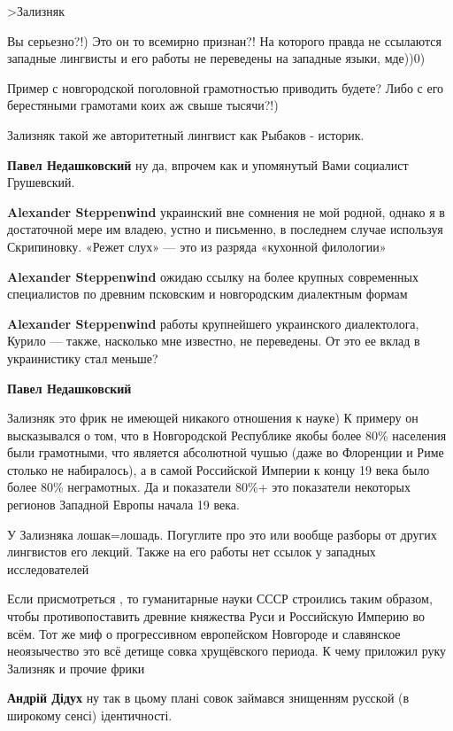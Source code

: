 \begin{itemize}
\begin{itemize}
>Зализняк

Вы серьезно?!) Это он то всемирно признан?! На которого правда не ссылаются
западные лингвисты и его работы не переведены на западные языки, мде))0)

Пример с новгородской поголовной грамотностью приводить будете? Либо с его
берестяными грамотами коих аж свыше тысячи?!)

Зализняк такой же авторитетный лингвист как Рыбаков - историк.

\textbf{Павел Недашковский} ну да, впрочем как и упомянутый Вами социалист Грушевский.

\textbf{Alexander Steppenwind} украинский вне сомнения не мой родной, однако я в достаточной мере им владею, устно и письменно, в последнем случае используя Скрипиновку. «Режет слух» — это из разряда «кухонной филологии»

\textbf{Alexander Steppenwind} ожидаю ссылку на более крупных современных специалистов по древним псковским и новгородским диалектным формам

\textbf{Alexander Steppenwind} работы крупнейшего украинского диалектолога, Курило — также, насколько мне известно, не переведены. От это ее вклад в украинистику стал меньше?

\textbf{Павел Недашковский} 

Зализняк это фрик не имеющей никакого отношения к науке) К примеру он
высказывался о том, что в Новгородской Республике якобы более 80\% населения
были грамотными, что является абсолютной чушью (даже во Флоренции и Риме
столько не набиралось), а в самой Российской Империи к концу 19 века было более
80\% неграмотных. Да и показатели 80\%+ это показатели некоторых регионов
Западной Европы начала 19 века.

У Зализняка лошак=лошадь. Погуглите про это или вообще разборы от других
лингвистов его лекций. Также на его работы нет ссылок у западных исследователей


Если присмотреться , то гуманитарные науки СССР строились таким образом, чтобы
противопоставить древние княжества Руси и Российскую Империю во всём. Тот же
миф о прогрессивном европейском Новгороде и славянское неоязычество это всё
детище совка хрущёвского периода. К чему приложил руку Зализняк и прочие фрики

\textbf{Андрій Дідух} ну так в цьому плані совок займався знищенням русской (в широкому сенсі) ідентичності.


\end{itemize}
\end{itemize}
